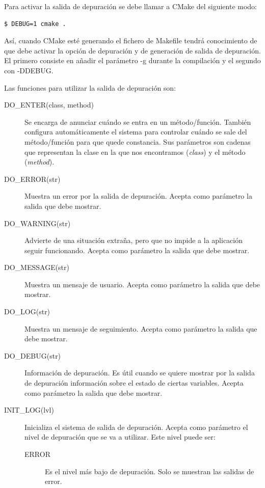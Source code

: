 Para activar la salida de depuración se debe llamar a CMake del siguiente modo:
\begin{verbatim}
$ DEBUG=1 cmake .
\end{verbatim}

Así, cuando CMake esté generando el fichero de Makefile tendrá conocimiento de que debe activar la opción de depuración y de generación de salida de depuración. El primero consiste en añadir el parámetro -g durante la compilación y el segundo con -DDEBUG.

Las funciones para utilizar la salida de depuración son:

\begin{description}
	\item[DO\_ENTER(class, method)] Se encarga de anunciar cuándo se entra en un método/función. También configura automáticamente el sistema para controlar cuándo se sale del método/función para que quede constancia. Sus parámetros son cadenas que representan la clase en la que nos encontramos (\emph{class}) y el método (\emph{method}).
	
	\item[DO\_ERROR(str)] Muestra un error por la salida de depuración. Acepta como parámetro la salida que debe mostrar.

	\item[DO\_WARNING(str)] Advierte de una situación extraña, pero que no impide a la aplicación seguir funcionando. Acepta como parámetro la salida que debe mostrar.

	\item[DO\_MESSAGE(str)] Muestra un mensaje de usuario. Acepta como parámetro la salida que debe mostrar.

	\item[DO\_LOG(str)] Muestra un mensaje de seguimiento. Acepta como parámetro la salida que debe mostrar.
	
	\item[DO\_DEBUG(str)] Información de depuración. Es útil cuando se quiere mostrar por la salida de depuración información sobre el estado de ciertas variables. Acepta como parámetro la salida que debe mostrar.

	\item[INIT\_LOG(lvl)] Inicializa el sistema de salida de depuración. Acepta como parámetro el nivel de depuración que se va a utilizar. Este nivel puede ser:
	\begin{description}
		\item[ERROR] Es el nivel más bajo de depuración. Solo se muestran las salidas de error.
		

\end{description}
\end{description}
